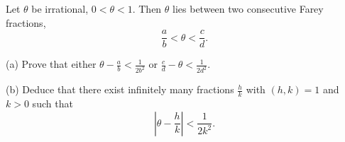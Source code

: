 Let $\theta$ be irrational, $0 < \theta < 1$. Then $\theta$ lies between two consecutive Farey fractions,
$$\frac{a}{b} < \theta < \frac{c}{d}.$$

(a) Prove that either $\theta - \frac{a}{b} < \frac{1}{2b^2}$ or $\frac{c}{d} - \theta < \frac{1}{2d^2}$.

(b) Deduce that there exist infinitely many fractions $\frac{h}{k}$ with $(h, k) = 1$ and $k > 0$ such that
$$\left| \theta - \frac{h}{k} \right| < \frac{1}{2k^2}.$$
